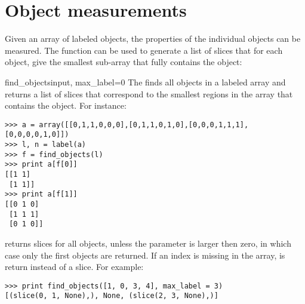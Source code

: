 \section{Object measurements}
Given an array of labeled objects, the properties of the individual objects 
can be measured. The  function can be used to 
generate a list of slices that for each object, give the smallest sub-array 
that fully contains the object:

\begin{funcdesc}{find_objects}{input, max_label=0}
  The  finds all objects in a labeled array and 
  returns a list of slices that correspond to the smallest regions in the 
  array that contains the object. For instance:
\begin{verbatim}
>>> a = array([[0,1,1,0,0,0],[0,1,1,0,1,0],[0,0,0,1,1,1],[0,0,0,0,1,0]])
>>> l, n = label(a)
>>> f = find_objects(l)
>>> print a[f[0]]
[[1 1]
 [1 1]]
>>> print a[f[1]]
[[0 1 0]
 [1 1 1]
 [0 1 0]]
\end{verbatim}
 returns slices for all objects, unless the
 parameter is larger then zero, in which case only the first
 objects are returned. If an index is missing in the 
 array,  is return instead of a slice. For 
example:
\begin{verbatim}
>>> print find_objects([1, 0, 3, 4], max_label = 3)
[(slice(0, 1, None),), None, (slice(2, 3, None),)]
\end{verbatim}
\end{funcdesc}


